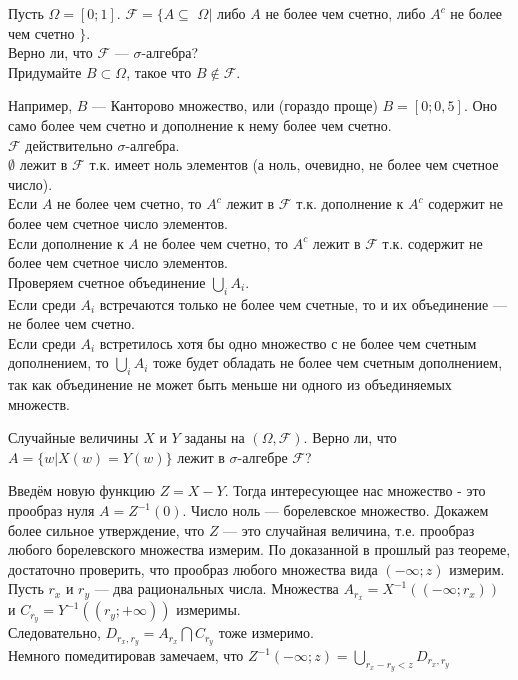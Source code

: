 \begin{problem}
Пусть $\Omega=[0;1]$. $\mathcal{F}=\{A\subseteq$ $\Omega|$ либо $A$ не
более чем счетно, либо $A^{c}$ не более чем счетно $\}$. \\
Верно ли, что $\mathcal{F}$ — $\sigma$-алгебра? \\
Придумайте $B\subset\Omega$, такое что $B \notin\mathcal{F}$.

\begin{sol}
Например, $B$ — Канторово множество, или (гораздо проще)
$B=[0;0,5]$. Оно само более чем счетно и дополнение к нему более
чем счетно. \\
$\mathcal{F}$ действительно $\sigma$-алгебра. \\
$\emptyset$ лежит в $\mathcal{F}$ т.к. имеет ноль элементов (а ноль,
очевидно, не более чем счетное число). \\
Если $A$ не более чем счетно, то $A^{c}$ лежит в $\mathcal{F}$
т.к. дополнение к $A^{c}$ содержит не более чем счетное
число элементов. \\
Если дополнение к $A$ не более чем счетно, то $A^{c}$ лежит
в $\mathcal{F}$ т.к. содержит не более чем счетное число элементов. \\
Проверяем счетное объединение $\bigcup_{i} A_{i}$. \\
Если среди $A_{i}$ встречаются только не более чем счетные, то и
их объединение — не более чем счетно. \\
Если среди $A_{i}$ встретилось хотя бы одно множество с не более
чем счетным дополнением, то $\bigcup_{i} A_{i}$ тоже будет
обладать не более чем счетным дополнением, так как объединение не
может быть меньше ни одного из объединяемых множеств.
\end{sol}
\end{problem}

\begin{problem}
Случайные величины $X$ и $Y$ заданы на $(\Omega,\mathcal{F})$. Верно ли, что $A=\{w|X(w)=Y(w)\}$ лежит в $\sigma$-алгебре $\mathcal{F}$?

\begin{sol}

Введём новую функцию $Z=X-Y$. Тогда интересующее нас множество -
это прообраз нуля $A=Z^{-1}(0)$. Число ноль — борелевское
множество. Докажем более сильное утверждение, что $Z$ — это
случайная величина, т.е. прообраз любого борелевского множества
измерим.
По доказанной в прошлый раз теореме, достаточно проверить, что
прообраз любого множества вида $(-\infty;z)$ измерим. \\
Пусть $r_{x}$ и $r_{y}$ — два рациональных числа. Множества
$A_{r_{x}}=X^{-1}((-\infty;r_{x}))$ и
$C_{r_{y}}=Y^{-1}((r_{y};+\infty))$ измеримы. \\
Следовательно, $D_{r_{x},r_{y}}=A_{r_{x}} \bigcap C_{r_{y}}$ тоже
измеримо. \\
Немного помедитировав замечаем, что $Z^{-1}(-\infty;z)=\bigcup_{r_{x}-r_{y}<z} D_{r_{x},r_{y}}$
\end{sol}
\end{problem}


